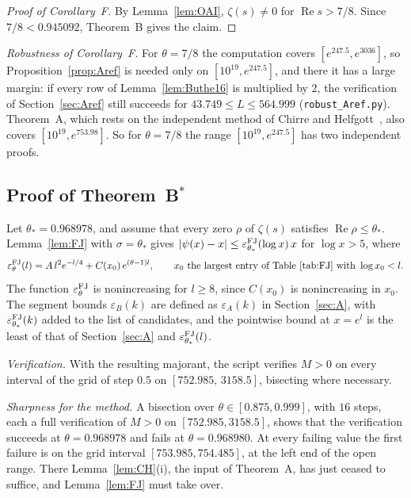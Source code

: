 \documentclass{amsart}
\theoremstyle{definition}
\theoremstyle{remark}
\theoremstyle{plain}
\numberwithin{equation}{section}
\newcommand{\eps}{\varepsilon}
\newcommand{\Bstar}{B$^*$}
\newcommand{\thetaB}{0.945092}
\begin{document}
\begin{proof}[Proof of Corollary~F]
By Lemma~\ref{lem:OAI}, $\zeta(s)\ne0$ for $\operatorname{Re}s>7/8$. Since $7/8<\thetaB$, Theorem~B gives the claim.
\end{proof}

\emph{Robustness of Corollary~F.} For $\theta=7/8$ the computation covers $[e^{247.5},e^{3036}]$, so Proposition~\ref{prop:Aref} is needed only on $[10^{19},e^{247.5}]$, and there it has a large margin: if every row of Lemma~\ref{lem:Buthe16} is multiplied by $2$, the verification of Section~\ref{sec:Aref} still succeeds for $43.749\le L\le564.999$ (\texttt{robust\_Aref.py}). Theorem~A, which rests on the independent method of Chirre and Helfgott~\cite{CH25}, also covers $[10^{19},e^{753.98}]$. So for $\theta=7/8$ the range $[10^{19},e^{247.5}]$ has two independent proofs.

\subsection{\texorpdfstring{Proof of Theorem~\Bstar}{Proof of Theorem B*}}\label{sec:Bstar}

Let $\theta_*=0.968978$, and assume that every zero $\rho$ of $\zeta(s)$ satisfies $\operatorname{Re}\rho\le\theta_*$. Lemma~\ref{lem:FJ} with $\sigma=\theta_*$ gives $|\psi(x)-x|\le\eps^{\rm FJ}_{\theta_*}(\log x)\,x$ for $\log x>5$, where
\[
\eps^{\rm FJ}_{\theta}(l)=A\,l^2e^{-l/4}+C(x_0)\,e^{(\theta-1)l},\qquad x_0\text{ the largest entry of Table~\ref{tab:FJ} with }\log x_0<l.
\]
The function $\eps^{\rm FJ}_{\theta}$ is nonincreasing for $l\ge8$, since $C(x_0)$ is nonincreasing in $x_0$. The segment bounds $\eps_B(k)$ are defined as $\eps_A(k)$ in Section~\ref{sec:A}, with $\eps^{\rm FJ}_{\theta_*}(k)$ added to the list of candidates, and the pointwise bound at $x=e^l$ is the least of that of Section~\ref{sec:A} and $\eps^{\rm FJ}_{\theta_*}(l)$.

\emph{Verification.} With the resulting majorant, the script verifies $M>0$ on every interval of the grid of step $0.5$ on $[752.985,\,3158.5]$, bisecting where necessary.

\emph{Sharpness for the method.} A bisection over $\theta\in[0.875,0.999]$, with $16$ steps, each a full verification of $M>0$ on $[752.985,3158.5]$, shows that the verification succeeds at $\theta=0.968978$ and fails at $\theta=0.968980$. At every failing value the first failure is on the grid interval $[753.985,754.485]$, at the left end of the open range. There Lemma~\ref{lem:CH}(i), the input of Theorem~A, has just ceased to suffice, and Lemma~\ref{lem:FJ} must take over.
\end{document}

